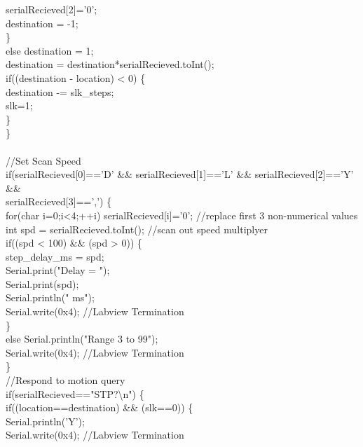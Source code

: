 {{{\tabto*{1.5cm}		serialRecieved[2]='0';\\
\tabto*{1.5cm}		destination = -1;\\
\tabto*{1cm}	\}\\
\tabto*{1cm}	else destination = 1;\\	
\tabto*{1cm}	destination = destination*serialRecieved.toInt();\\
\tabto*{1cm}	if((destination - location) < 0) \{\\
\tabto*{1.5cm}		destination -= slk\_steps;\\
\tabto*{1.5cm}		slk=1;\\
\tabto*{1cm}	\}\\	
\tabto*{.5cm}\}\\
\\
\tabto*{.5cm}//Set Scan Speed\\
\tabto*{.5cm}if(serialRecieved[0]=='D' \&\& serialRecieved[1]=='L' \&\& serialRecieved[2]=='Y' \&\&\\\tabto*{.5cm} serialRecieved[3]==',') \{\\
\tabto*{1cm}	for(char i=0;i<4;++i) serialRecieved[i]='0';\tabto*{9.5cm} //replace first 3 non-numerical values\\
\tabto*{1cm}	int spd = serialRecieved.toInt();\tabto*{7.5cm} //scan out speed multiplyer\\
\tabto*{1cm}	if((spd < 100) \&\& (spd > 0)) \{\\
\tabto*{1.5cm}		step\_delay\_ms = spd;\\
\tabto*{1.5cm}		Serial.print("Delay = ");\\
\tabto*{1.5cm}		Serial.print(spd);\\
\tabto*{1.5cm}		Serial.println(" ms");\\
\tabto*{1.5cm}		Serial.write(0x4); \tabto*{7.5cm} //Labview Termination\\
\tabto*{1cm}	\}\\
\tabto*{1cm}	else Serial.println("Range 3 to 99");\\
\tabto*{1cm}	Serial.write(0x4); \tabto*{7.5cm} //Labview Termination\\
\tabto*{.5cm}\}\\
\tabto*{.5cm}//Respond to motion query\\
\tabto*{.5cm}if(serialRecieved=="STP?\textbackslash n") \{\\
\tabto*{1cm}	if((location==destination) \&\& (slk==0)) \{\\
\tabto*{1.5cm}		Serial.println('Y');\\
\tabto*{1.5cm}		Serial.write(0x4); \tabto*{7.5cm} //Labview Termination\\
}}}
